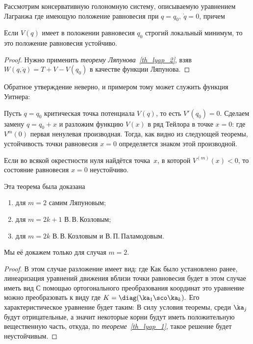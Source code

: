 \documentclass[a4paper,12pt]{article}
\newcommand{\tdf}[1]{\textsl{#1}}
\newcommand{\tstm}[1]{\emph{#1}}
\newcommand{\spr}[2]{\hr{#1 \cdot #2}}
\begin{document}
Рассмотрим консервативную голономную систему, описываемую уравнением Лагранжа
 где
\equ{T=\frac12\spr{A(q)\dot{q}}{\dot{q}},} имеющую положение равновесия при $q=q_0,\ \dot{q}=0$,
причем 
\begin{theorem}
Если $V(q)$ имеет в положении равновесия $q_0$ строгий локальный минимум, то это положение
равновесия устойчиво.
\end{theorem}
\begin{proof}
Нужно применить \tdf{теорему Ляпунова~\ref{th_lyap_2}}, взяв $W(q,\dot{q})=T+V-V(q_0)$ в качестве функции Ляпунова.
\end{proof}
\begin{note}
Обратное утверждение неверно, и примером тому может служить функция Уитнера:
\end{note}
Пусть $q=q_0$ критическая точка потенциала $V(q)$,
то есть ${V'(q_0)=0}$. Сделаем замену $q=q_0+x$ и разложим
функцию $V(x)$ в ряд Тейлора в точке $x=0$:
 где $V^{m}(0)$
первая ненулевая производная. Тогда, как видно из следующей теоремы,
устойчивость точки равновесия $x=0$ определяется знаком этой
производной.
\begin{theorem}
\label{th_lyap_3}
Если во всякой окрестности нуля найдётся точка~$x$, в которой $V^{(m)}(x)<0$,
то состояние равновесия $x=0$ неустойчиво.
\end{theorem}
\begin{note}
Эта теорема была доказана
\begin{enumerate}
  \item для $m=2$ самим Ляпуновым;
  \item для $m=2k+1$ В.\,В.\,Козловым;
  \item для $m=2k$ В.\,В.\,Козловым и В.\,П.\,Паламодовым.
\end{enumerate}
\end{note}
Мы её докажем только для случая $m=2$.
\begin{proof}
В этом случае разложение имеет вид:
 где
 Как было установлено
ранее, линеаризация уравнений движения вблизи точки равновесия будет
в этом случае иметь вид  С помощью
ортогонального преобразования координат это уравнение можно
преобразовать к виду  где
$K=\diag(\ka_1\sco\ka_k).$ Его характеристическое уравнение будет
таким:  В силу
условия теоремы, среди $\ka_j$ будут отрицательные, а значит
некоторые корни будут иметь положительную вещественную часть,
откуда, по \tstm{теореме~\ref{th_lyap_1}}, такое решение будет неустойчивым.
\end{proof}
\end{document}
